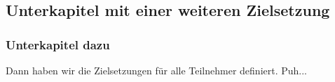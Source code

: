 \subsection{Unterkapitel mit einer weiteren Zielsetzung}
\subsubsection{Unterkapitel dazu}

Dann haben wir die Zielsetzungen für alle Teilnehmer definiert. Puh...
